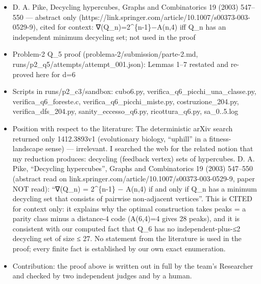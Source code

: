 \begin{itemize}
\tightlist
\item
  D. A. Pike, Decycling hypercubes, Graphs and Combinatorics 19 (2003)
  547--550 --- abstract only
  (https://link.springer.com/article/10.1007/s00373-003-0529-9), cited
  for context: ∇(Q\_n)=2\^{}\{n-1\}−A(n,4) iff Q\_n has an independent
  minimum decycling set; not used in the proof
\item
  Problem-2 Q\_5 proof (problema-2/submission/parte-2.md,
  runs/p2\_q5/attempts/attempt\_001.json): Lemmas 1--7 restated and
  re-proved here for d=6
\item
  Scripts in runs/p2\_c3/sandbox: cubo6.py,
  verifica\_q6\_picchi\_una\_classe.py, verifica\_q6\_foreste.c,
  verifica\_q6\_picchi\_miste.py, costruzione\_204.py,
  verifica\_dfs\_204.py, sanity\_eccesso\_q6.py, ricottura\_q6.py,
  sa\_0..5.log
\item
  Position with respect to the literature: The deterministic arXiv
  search returned only 1412.3893v1 (evolutionary biology, ``uphill'' in
  a fitness-landscape sense) --- irrelevant. I searched the web for the
  related notion that my reduction produces: decycling (feedback vertex)
  sets of hypercubes. D. A. Pike, ``Decycling hypercubes'', Graphs and
  Combinatorics 19 (2003) 547--550 (abstract read on
  link.springer.com/article/10.1007/s00373-003-0529-9, paper NOT read):
  ``∇(Q\_n) = 2\^{}\{n-1\} − A(n,4) if and only if Q\_n has a minimum
  decycling set that consists of pairwise non-adjacent vertices''. This
  is CITED for context only: it explains why the optimal construction
  takes peaks = a parity class minus a distance-4 code (A(6,4)=4 gives
  28 peaks), and it is consistent with our computed fact that Q\_6 has
  no independent-plus-≤2 decycling set of size ≤ 27. No statement from
  the literature is used in the proof; every finite fact is established
  by our own exact enumeration.
\item
  Contribution: the proof above is written out in full by the team's
  Researcher and checked by two independent judges and by a human.
\end{itemize}


